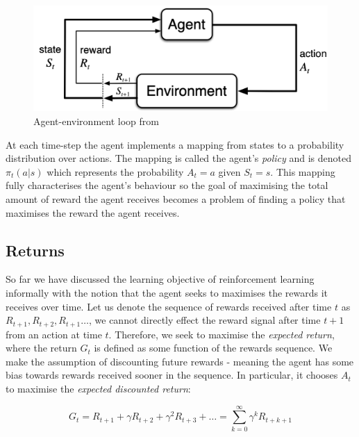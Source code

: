 \documentclass{article}
\begin{document}
\

\begin{figure}
	\centering
	\includegraphics[scale=0.6]{images/agent_environment.png}
	\caption{Agent-environment loop from \citet{sutton2018reinforcement}}
	\label{fig:agent_environment}
\end{figure}

At each time-step the agent implements a mapping from states to a probability distribution over actions. The mapping is called the agent's \textit{policy} and is denoted $\pi_t(a | s)$ which represents the probability $A_t = a$ given $S_t = s$. This mapping fully characterises the agent's behaviour \citep{silver2015rl} so the goal of maximising the total amount of reward the agent receives becomes a problem of finding a policy that maximises the reward the agent receives. 

\subsection{Returns}


So far we have discussed the learning objective of reinforcement learning informally with the notion that the agent seeks to maximises the rewards it receives over time. Let us denote the sequence of rewards received after time $t$ as $R_{t+1}, R_{t+2}, R_{t+1} \hdots$, we cannot directly effect the reward signal after time $t+1$ from an action at time $t$. Therefore, we seek to maximise the \textit{expected return}, where the return $G_t$ is defined as some function of the rewards sequence. We make the assumption of discounting future rewards - meaning the agent has some bias towards rewards received sooner in the sequence. In particular, it chooses $A_t$ to maximise the \textit{expected discounted return}:

\begin{equation}\label{eq:returns}
	G_t = R_{t+1} + \gamma R_{t+2}+ \gamma^2 R_{t+3} + \hdots = \sum_{k=0}^\infty \gamma^k R_{t + k + 1}
\end{equation}
\end{document}
